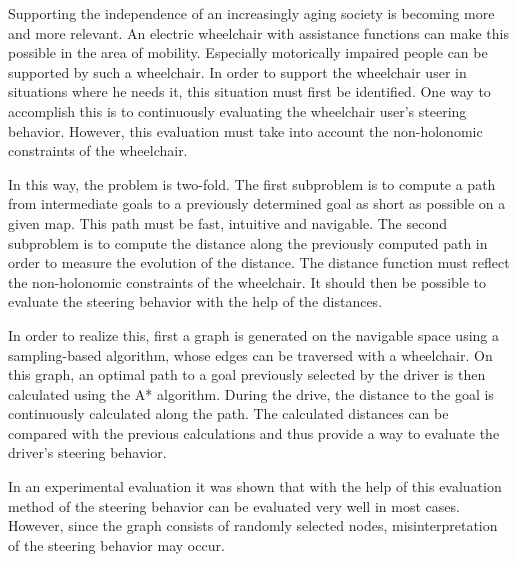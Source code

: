 



Supporting the independence of an increasingly aging society is becoming more and more relevant. An electric wheelchair with assistance functions can make this possible in the area of mobility. Especially motorically impaired people can be supported by such a wheelchair. In order to support the wheelchair user in situations where he needs it, this situation must first be identified. One way to accomplish this is to continuously evaluating the wheelchair user's steering behavior. However, this evaluation must take into account the non-holonomic constraints of the wheelchair.

In this way, the problem is two-fold. The first subproblem is to compute a path from intermediate goals to a previously determined goal as short as possible on a given map. This path must be fast, intuitive and navigable. The second subproblem is to compute the distance along the previously computed path in order to measure the evolution of the distance. The distance function must reflect the non-holonomic constraints of the wheelchair. It should then be possible to evaluate the steering behavior with the help of the distances.

In order to realize this, first a graph is generated on the navigable space using a sampling-based algorithm, whose edges can be traversed with a wheelchair. On this graph, an optimal path to a goal previously selected by the driver is then calculated using the A* algorithm. During the drive, the distance to the goal is continuously calculated along the path. The calculated distances can be compared with the previous calculations and thus provide a way to evaluate the driver's steering behavior.

In an experimental evaluation it was shown that with the help of this evaluation method of the steering behavior can be evaluated very well in most cases. However, since the graph consists of randomly selected nodes, misinterpretation of the steering behavior may occur.



